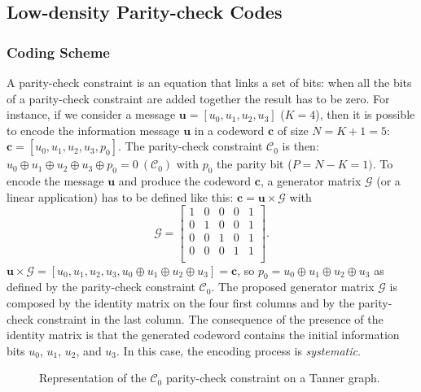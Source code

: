 \subsection{Low-density Parity-check Codes}
\label{sec:ctx_ldpc}

\subsubsection{Coding Scheme}

A parity-check constraint is an equation that links a set of bits: when all the
bits of a parity-check constraint are added together the result has to be
zero. For instance, if we consider a message $\bm{u} = [u_0, u_1, u_2, u_3]$
($K = 4$), then it is possible to encode the information message $\bm{u}$ in a
codeword $\bm{c}$ of size $N = K + 1 = 5$: $\bm{c} = [u_0,u_1,u_2,u_3,p_0]$.
The parity-check constraint $\mathcal{C}_0$ is then: $u_0 \oplus u_1 \oplus u_2
\oplus u_3 \oplus p_0 = 0~(\mathcal{C}_0)$ with $p_0$ the parity bit ($P = N -
K = 1)$. To encode the message $\bm{u}$ and produce the codeword $\bm{c}$, a
generator matrix $\bm{\mathcal{G}}$ (or a linear application) has to be defined
like this: $\bm{c} = \bm{u} \times \bm{\mathcal{G}}$ with
\begin{equation*}
\bm{\mathcal{G}} =
\begin{bmatrix}
1 & 0 & 0 & 0 & 1\\
0 & 1 & 0 & 0 & 1\\
0 & 0 & 1 & 0 & 1\\
0 & 0 & 0 & 1 & 1\\
\end{bmatrix}
.
\end{equation*}
$\bm{u} \times \bm{\mathcal{G}} = [u_0,u_1,u_2,u_3,u_0 \oplus u_1 \oplus u_2
\oplus u_3] = \bm{c}$, so $p_0 = u_0 \oplus u_1 \oplus u_2 \oplus u_3$ as
defined by the parity-check constraint $\mathcal{C}_0$. The proposed
generator matrix $\bm{\mathcal{G}}$ is composed by the identity matrix on the
four first columns and by the parity-check constraint in the last column.
The consequence of the presence of the identity matrix is that the generated
codeword contains the initial information bits $u_0$, $u_1$, $u_2$, and $u_3$.
In this case, the encoding process is \emph{systematic}.

\begin{figure}[htp]
  \centering
  \caption{Representation of the $\mathcal{C}_0$ parity-check constraint on a
    Tanner graph.}
  \label{fig:ctx_ldpc_parity_check}
\end{figure}


